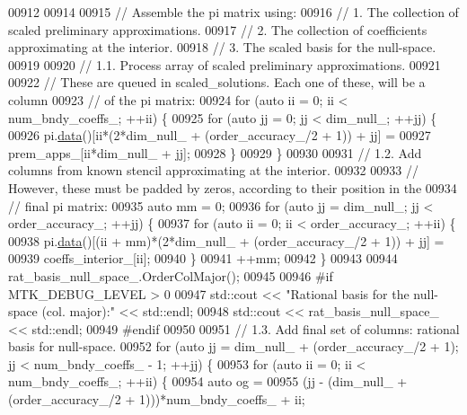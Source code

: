 \begin{DoxyCode}
{{00912 
00914 
00915   \textcolor{comment}{// Assemble the pi matrix using:}
00916   \textcolor{comment}{// 1. The collection of scaled preliminary approximations.}
00917   \textcolor{comment}{// 2. The collection of coefficients approximating at the interior.}
00918   \textcolor{comment}{// 3. The scaled basis for the null-space.}
00919 
00920   \textcolor{comment}{// 1.1. Process array of scaled preliminary approximations.}
00921 
00922   \textcolor{comment}{// These are queued in scaled\_solutions. Each one of these, will be a column}
00923   \textcolor{comment}{// of the pi matrix:}
00924   \textcolor{keywordflow}{for} (\textcolor{keyword}{auto} ii = 0; ii < num\_bndy\_coeffs\_; ++ii) \{
00925     \textcolor{keywordflow}{for} (\textcolor{keyword}{auto} jj = 0; jj < dim\_null\_; ++jj) \{
00926       pi.\hyperlink{classmtk_1_1DenseMatrix_a16b3ff56feb2658b9fc7147d1de4d8e7}{data}()[ii*(2*dim\_null\_ + (order\_accuracy\_/2 + 1)) + jj] =
00927         prem\_apps\_[ii*dim\_null\_ + jj];
00928     \}
00929   \}
00930 
00931   \textcolor{comment}{// 1.2. Add columns from known stencil approximating at the interior.}
00932 
00933   \textcolor{comment}{// However, these must be padded by zeros, according to their position in the}
00934   \textcolor{comment}{// final pi matrix:}
00935   \textcolor{keyword}{auto} mm = 0;
00936   \textcolor{keywordflow}{for} (\textcolor{keyword}{auto} jj = dim\_null\_; jj < order\_accuracy\_; ++jj) \{
00937     \textcolor{keywordflow}{for} (\textcolor{keyword}{auto} ii = 0; ii < order\_accuracy\_; ++ii) \{
00938       pi.\hyperlink{classmtk_1_1DenseMatrix_a16b3ff56feb2658b9fc7147d1de4d8e7}{data}()[(ii + mm)*(2*dim\_null\_ + (order\_accuracy\_/2 + 1)) + jj] =
00939         coeffs\_interior\_[ii];
00940     \}
00941     ++mm;
00942   \}
00943 
00944   rat\_basis\_null\_space\_.OrderColMajor();
00945 
00946 \textcolor{preprocessor}{  #if MTK\_DEBUG\_LEVEL > 0}
00947   std::cout << \textcolor{stringliteral}{"Rational basis for the null-space (col. major):"} << std::endl;
00948   std::cout << rat\_basis\_null\_space\_ << std::endl;
00949 \textcolor{preprocessor}{  #endif}
00950 
00951   \textcolor{comment}{// 1.3. Add final set of columns: rational basis for null-space.}
00952   \textcolor{keywordflow}{for} (\textcolor{keyword}{auto} jj = dim\_null\_ + (order\_accuracy\_/2 + 1); jj < num\_bndy\_coeffs\_ - 1; ++jj) \{
00953     \textcolor{keywordflow}{for} (\textcolor{keyword}{auto} ii = 0; ii < num\_bndy\_coeffs\_; ++ii) \{
00954       \textcolor{keyword}{auto} og =
00955         (jj - (dim\_null\_ + (order\_accuracy\_/2 + 1)))*num\_bndy\_coeffs\_ + ii;
}}
\end{DoxyCode}

